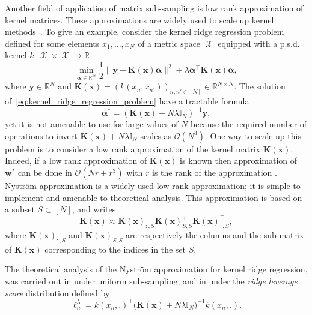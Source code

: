 \documentclass[twoside,11pt]{book}
\numberwithin{theorem}{chapter}
\numberwithin{definition}{chapter}
\numberwithin{proposition}{chapter}
\numberwithin{corollary}{chapter}
\numberwithin{example}{chapter}
\numberwithin{lemma}{chapter}
\numberwithin{assumption}{chapter}
\numberwithin{equation}{chapter}
\numberwithin{figure}{chapter}
\DeclareMathOperator{\Tran}{\intercal}
\DeclareMathOperator{\X}{\mathcal{X}}
\begin{document}
Another field of application of matrix sub-sampling is low rank approximation of kernel matrices. These approximations are widely used to scale up kernel methods~\citep{ScSm18,ShCr04}. To give an example, consider the kernel ridge regression problem defined for
  some elements $x_{1}, \dots, x_{N}$ of a metric space $\X$ equipped with a p.s.d. kernel $k: \X \times \X \rightarrow \mathbb{R}$
\begin{equation}\label{eq:kernel_ridge_regression_problem}
\min\limits_{\bm{\alpha} \in \mathbb{R}^{N}} \frac{1}{2}\|\bm{y} - \bm{K}(\bm{x}) \bm{\alpha}\|^{2} + \lambda \bm{\alpha}^{\Tran} \bm{K}(\bm{x}) \bm{\alpha},
\end{equation}
where $\bm{y} \in \mathbb{R}^{N}$ and $\bm{K}(\bm{x}) = (k(x_{n},x_{n'}))_{n,n' \in [N]} \in \mathbb{R}^{N \times N}$.
The solution of~\eqref{eq:kernel_ridge_regression_problem} have a tractable formula
\begin{equation}
\bm{\alpha}^{*} = (\bm{K}(\bm{x}) +N\lambda \mathbb{I}_{N})^{-1} \bm{y},
\end{equation}
yet it is not amenable to use for large values of $N$ because the required number of operations to invert $\bm{K}(\bm{x}) +N\lambda \mathbb{I}_{N}$ scales as $\mathcal{O}(N^{3})$. One way to scale up this problem is to consider a low rank approximation of the kernel matrix $\bm{K}(\bm{x})$. Indeed, if a low rank approximation of $\bm{K}(\bm{x})$ is known then approximation of $\bm{w}^{*}$ can be done in $\mathcal{O}(Nr + r^{3})$ with $r$ is the rank of the approximation \citep{SmSc00,WiSe01}. Nystr{\"o}m approximation is a widely used low rank approximation; it is simple to implement and amenable to theoretical analysis. This approximation is based on a subset $S \subset [N]$, and writes
\begin{equation}
\bm{K}(\bm{x}) \approx \bm{K}(\bm{x})_{:,S} \bm{K}(\bm{x})_{S,S}^{+} \bm{K}(\bm{x})_{:,S}^{\Tran},
\end{equation}
where $\bm{K}(\bm{x})_{:,S}$ and $\bm{K}(\bm{x})_{S,S}$ are respectively the columns and the sub-matrix of $\bm{K}(\bm{x})$ corresponding to the indices in the set $S$.

The theoretical analysis of the Nystr{\"o}m approximation for kernel ridge regression, was carried out in \citep{Bac13} under uniform sub-sampling, and in \citep{AlMa15} under the 
\emph{ridge leverage score} distribution defined by
\begin{equation}\label{eq:introduction_rlv_score}
\ell^{\lambda}_{n} = k(x_{n},.)^{\Tran} \big( \bm{K}(\bm{x}) + N \lambda \mathbb{I}_{N} \big)^{-1}k(x_{n},.).
\end{equation}
\end{document}
